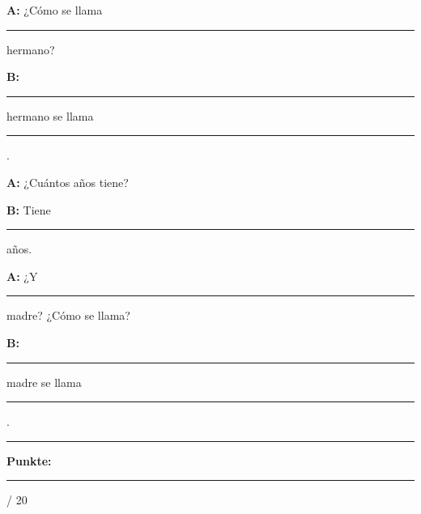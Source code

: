 \documentclass[11pt, a4paper]{article}
\newcommand{\maxpunkte}{20}
\newcommand{\luecke}[1]{\rule{#1}{0.4pt}}
\begin{document}
\vspace{0.5em}

\noindent
\textbf{A:} ¿Cómo se llama \luecke{2cm} hermano?

\vspace{0.8em}

\noindent
\textbf{B:} \luecke{2cm} hermano se llama \luecke{3cm}.

\vspace{0.8em}

\noindent
\textbf{A:} ¿Cuántos años tiene?

\vspace{0.8em}

\noindent
\textbf{B:} Tiene \luecke{2cm} años.

\vspace{0.8em}

\noindent
\textbf{A:} ¿Y \luecke{2cm} madre? ¿Cómo se llama?

\vspace{0.8em}

\noindent
\textbf{B:} \luecke{2cm} madre se llama \luecke{3cm}.


\vspace{20pt}
\hrule
\vspace{10pt}

\begin{flushright}
\textbf{Punkte:} \luecke{1cm} / \maxpunkte
\end{flushright}
\end{document}

